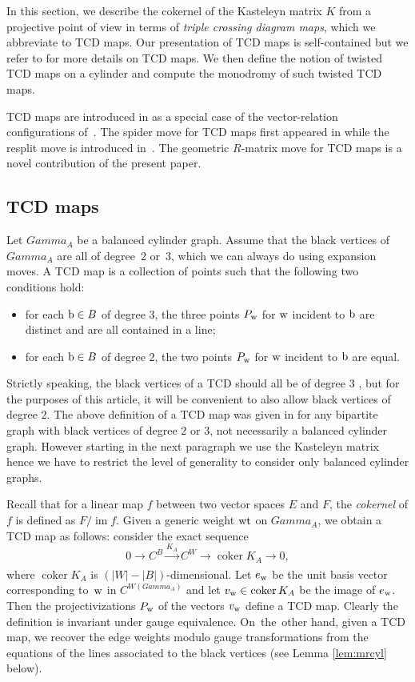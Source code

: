 \documentclass[10pt,a4paper]{amsart}
\numberwithin{equation}{section}
\newcommand{\C}{{\mathbb C}}
\newcommand{\CP}{{\mathbb C\mathrm P}}
\newcommand{\A}{{\mathbb A}}
\newcommand{\ra}{\rightarrow}
\newcommand{\w}{{\rm w}}
\newcommand{\wt}{{\rm wt}}
\DeclareMathOperator{\coker}{coker}
\DeclareMathOperator{\im}{im}
\def\A{A}
\def\Gamma{Gamma}
\def\C{C}
\begin{document}
	In this section, we describe the cokernel of the Kasteleyn matrix $K$ from a projective point of view in terms of \emph{triple crossing diagram maps}, which we abbreviate to TCD maps. Our presentation of TCD maps is self-contained but we refer to \cite{AGPR,AGR} for more details on TCD maps. We then define the notion of twisted TCD maps on a cylinder and compute the monodromy of such twisted TCD maps.
	
	TCD maps are introduced in \cite{AGR, athesis} as a special case of the vector-relation configurations of~\cite{AGPR}. The spider move for TCD maps first appeared in \cite{AGPR} while the resplit move is introduced in~\cite{AGR, athesis}. The geometric $R$-matrix move for TCD maps is a novel contribution of the present paper.
	
	\subsection{TCD maps}
	\label{subsec:tcdmaps}
	
	Let $\Gamma_\A$ be a balanced cylinder graph. Assume that the black vertices of $\Gamma_\A$ are all of degree~$2$ or~$3$, which we can always do using expansion moves. A TCD map is a collection of points \smash{$(P_{\rm w})_{{\rm w}\in W} \in \CP^{|W|-|B|-1}$} such that the following two conditions hold:
	\begin{itemize}\itemsep=0pt
		\item for each ${\rm b} \in B$ of degree $3$, the three points $P_{\rm w}$ for ${\rm w}$ incident to ${\rm b}$ are distinct and are all contained in a line;
		\item for each ${\rm b} \in B$ of degree $2$, the two points $P_{\rm w}$ for ${\rm w}$ incident to ${\rm b}$ are equal.
	\end{itemize}
	Strictly speaking, the black vertices of a TCD should all be of degree $3$ \cite{thurston}, but for the purposes of this article, it will be convenient to also allow black vertices of degree $2$. The above definition of a TCD map was given in \cite{AGR} for any bipartite graph with black vertices of degree $2$ or $3$, not necessarily a balanced cylinder graph. However starting in the next paragraph we use the Kasteleyn matrix hence we have to restrict the level of generality to consider only balanced cylinder graphs.
	
	
	Recall that for a linear map $f$ between two vector spaces $E$ and $F$, the \emph{cokernel} of $f$ is defined as $F/\im f$. Given a generic weight $\wt$ on $\Gamma_\A$, we obtain a TCD map as follows: consider the exact sequence
	\[
	0 \ra \C^{B} \xrightarrow[]{K_\A} \C^{W} \ra \coker K_\A \ra 0,
	\]
	where $\coker K_\A$ is ${(|W|-|B|)}$-dimensional. Let $e_\w$ be the unit basis vector corresponding to~$\w$ in $\C^{W(\Gamma_{\A})}$ and let $v_{\rm w} \in \coker K_\A$ be the image of $e_{\rm w}$. Then the projectivizations $P_{\rm w}$ of the vectors $v_{\rm w}$ define a TCD map. Clearly the definition is invariant under gauge equivalence. On~the~other hand, given a TCD map, we recover the edge weights modulo gauge transformations from the equations of the lines associated to the black vertices (see Lemma \ref{lem:mrcyl} below).
	
\end{document}

